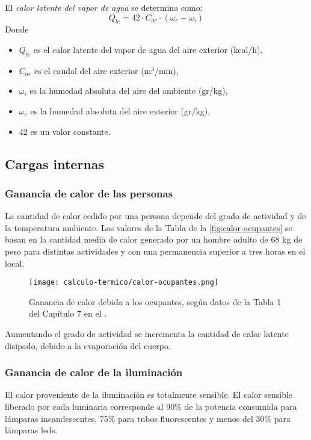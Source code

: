El \emph{calor latente del vapor de agua} se determina como:
\begin{equation}
	Q_{le} = 42 \cdot C_{ae} \cdot (\omega_e - \omega_i) 
\end{equation}
Donde \begin{itemize}
	\item $Q_{le}$ es el calor latente del vapor de agua del aire exterior (kcal/h),
	\item $C_{ae}$ es el caudal del aire exterior (m$^3$/min),
	\item $\omega_i$ es la humedad absoluta del aire del ambiente (gr/kg),
	\item $\omega_e$ es la humedad absoluta del aire exterior (gr/kg),
	\item $42$ es un valor constante.
\end{itemize}

\subsection{Cargas internas}

\subsubsection{Ganancia de calor de las personas}
La cantidad de calor cedido por una persona depende del grado de actividad y de la temperatura ambiente. Los valores de la Tabla de la \autoref{fig:calor-ocupantes} se basan en la cantidad media de calor generado por un hombre adulto de $68$ kg de peso para distintas actividades y con una permanencia superior a tres horas en el local.

\begin{figure}[H]
	\centering
	\caption{Ganancia de calor debida a los ocupantes, según datos de la Tabla 1 del Capítulo 7 en el .}
	\label{fig:calor-ocupantes}
	\texttt{[image: calculo-termico/calor-ocupantes.png]}
\end{figure}


Aumentando el grado de actividad se incrementa la cantidad de calor latente disipado, debido a la evaporación del cuerpo.

\subsubsection{Ganancia de calor de la iluminación}

El calor proveniente de la iluminación es totalmente sensible. El calor sensible liberado por cada luminaria corresponde al 90\% de la potencia consumida para lámparas incandescentes, 75\% para tubos fluorescentes y menos del 30\% para lámparas leds.


